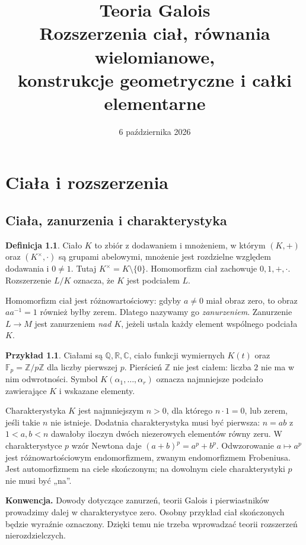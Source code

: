 \documentclass[11pt,a4paper,oneside]{book}
\title{Teoria Galois\\\large Rozszerzenia ciał, równania wielomianowe,\\ konstrukcje geometryczne i całki elementarne}
\author{}
\date{6 października 2026}
\numberwithin{equation}{section}
\theoremstyle{plain}
\theoremstyle{definition}
\newtheorem{definicja}[twierdzenie]{Definicja}
\newtheorem{przyklad}[twierdzenie]{Przykład}
\theoremstyle{remark}
\newcommand{\Q}{\mathbb{Q}}
\newcommand{\R}{\mathbb{R}}
\newcommand{\C}{\mathbb{C}}
\newcommand{\Z}{\mathbb{Z}}
\newcommand{\F}{\mathbb{F}}
\begin{document}
\frontmatter
\maketitle
\tableofcontents
\mainmatter

\chapter{Ciała i rozszerzenia}

\section{Ciała, zanurzenia i charakterystyka}

\begin{definicja}
Ciało $K$ to zbiór z dodawaniem i mnożeniem, w którym $(K,+)$ oraz $(K^\times,\cdot)$ są grupami abelowymi, mnożenie jest rozdzielne względem dodawania i $0\ne1$. Tutaj $K^\times=K\setminus\{0\}$. Homomorfizm ciał zachowuje $0,1,+,\cdot$. Rozszerzenie $L/K$ oznacza, że $K$ jest podciałem $L$.
\end{definicja}

Homomorfizm ciał jest różnowartościowy: gdyby $a\ne0$ miał obraz zero, to obraz $aa^{-1}=1$ również byłby zerem. Dlatego nazywamy go \emph{zanurzeniem}. Zanurzenie $L\to M$ jest zanurzeniem \emph{nad $K$}, jeżeli ustala każdy element wspólnego podciała $K$.

\begin{przyklad}
Ciałami są $\Q,\R,\C$, ciało funkcji wymiernych $K(t)$ oraz $\F_p=\Z/p\Z$ dla liczby pierwszej $p$. Pierścień $\Z$ nie jest ciałem: liczba $2$ nie ma w nim odwrotności. Symbol $K(\alpha_1,\dots,\alpha_r)$ oznacza najmniejsze podciało zawierające $K$ i wskazane elementy.
\end{przyklad}

Charakterystyka $K$ jest najmniejszym $n>0$, dla którego $n\cdot1=0$, lub zerem, jeśli takie $n$ nie istnieje. Dodatnia charakterystyka musi być pierwsza: $n=ab$ z $1<a,b<n$ dawałoby iloczyn dwóch niezerowych elementów równy zeru. W charakterystyce $p$ wzór Newtona daje $(a+b)^p=a^p+b^p$. Odwzorowanie $a\mapsto a^p$ jest różnowartościowym endomorfizmem, zwanym endomorfizmem Frobeniusa. Jest automorfizmem na ciele skończonym; na dowolnym ciele charakterystyki $p$ nie musi być „na”.

\noindent\textbf{Konwencja.} Dowody dotyczące zanurzeń, teorii Galois i pierwiastników prowadzimy dalej w charakterystyce zero. Osobny przykład ciał skończonych będzie wyraźnie oznaczony. Dzięki temu nie trzeba wprowadzać teorii rozszerzeń nierozdzielczych.
\end{document}
